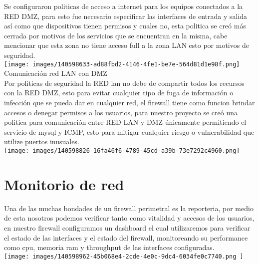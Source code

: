 \documentclass[10pt,a4paper]{article}
\begin{document}
Se configuraron politicas de acceso a internet para los equipos conectados a la RED DMZ, para esto fue necesario especificar las interfaces de entrada y salida así como que dispositivos tienen permisos y cuales no, esta politica se creó más cerrada por motivos de los servicios que se encuentran en la misma, cabe mencionar que esta zona no tiene acceso full a la zona LAN esto por motivos de seguridad.\\


\texttt{[image: images/140598633-ad88fbd2-4146-4fe1-be7e-564d81d1e98f.png]}\\


Comunicación red LAN con DMZ\\

Por politicas de seguridad la RED lan no debe de compartir todos los recursos con la RED DMZ, esto para evitar cualquier tipo de fuga de información o infección que se pueda dar en cualquier red, el firewall tiene como funcion brindar accesos o denegar permisos a los usuarios, para nuestro proyecto se creó una politica para comunicación entre RED LAN y DMZ únicamente permitiendo el servicio de mysql y ICMP, esto para mitigar cualquier riesgo o vulnerabilidad que utilize puertos inusuales.\\


\texttt{[image: images/140598826-16fa46f6-4789-45cd-a39b-73e7292c4960.png]}

\section*{
Monitorio de red}

Una de las muchas bondades de un firewall perimetral es la reporteria, por medio de esta nosotros podemos verificar tanto como vitalidad y accesos de los usuarios, en nuestro firewall configuramos un dashboard el cual utilizaremos para verificar el estado de las interfaces y el estado del firewall, monitoreando su performance como cpu, memoria ram y throughput de las interfaces configuradas.\\

\texttt{[image: images/140598962-45b068e4-2cde-4e0c-9dc4-6034fe0c7740.png
]}
\end{document}
